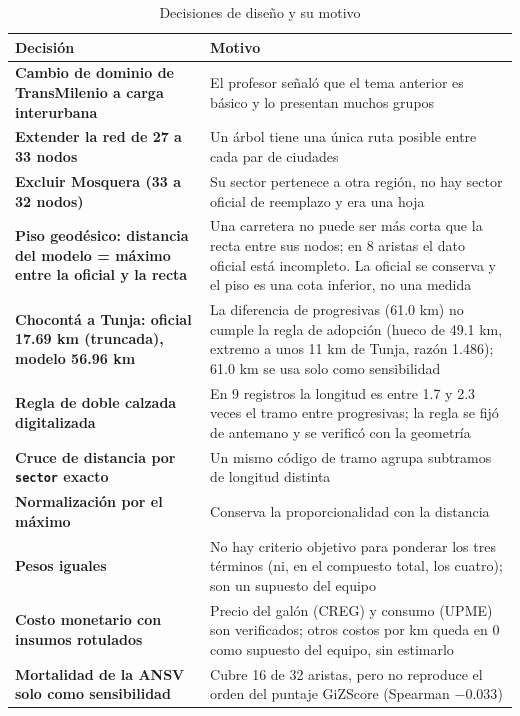 \documentclass[12pt,a4paper]{article}
\begin{document}
\begin{table}[H]
\centering
\caption{Decisiones de diseño y su motivo}
\label{tab:decisiones}
\small
\renewcommand{\arraystretch}{1.2}
\begin{tabular}{|>{\raggedright\arraybackslash}p{4.4cm}|>{\raggedright\arraybackslash}p{9cm}|}
\hline
\rowcolor{gray!20} \textbf{Decisión} & \textbf{Motivo} \\
\hline
\textbf{Cambio de dominio de TransMilenio a carga interurbana} & El profesor señaló que el tema anterior es básico y lo presentan muchos grupos \\
\hline
\textbf{Extender la red de 27 a 33 nodos} & Un árbol tiene una única ruta posible entre cada par de ciudades \\
\hline
\textbf{Excluir Mosquera (33 a 32 nodos)} & Su sector pertenece a otra región, no hay sector oficial de reemplazo y era una hoja \\
\hline
\textbf{Piso geodésico: distancia del modelo = máximo entre la oficial y la recta} & Una carretera no puede ser más corta que la recta entre sus nodos; en 8 aristas el dato oficial está incompleto. La oficial se conserva y el piso es una cota inferior, no una medida \\
\hline
\textbf{Chocontá a Tunja: oficial 17.69 km (truncada), modelo 56.96 km} & La diferencia de progresivas (61.0 km) no cumple la regla de adopción (hueco de 49.1 km, extremo a unos 11 km de Tunja, razón 1.486); 61.0 km se usa solo como sensibilidad \\
\hline
\textbf{Regla de doble calzada digitalizada} & En 9 registros la longitud es entre 1.7 y 2.3 veces el tramo entre progresivas; la regla se fijó de antemano y se verificó con la geometría \\
\hline
\textbf{Cruce de distancia por \texttt{sector} exacto} & Un mismo código de tramo agrupa subtramos de longitud distinta \\
\hline
\textbf{Normalización por el máximo} & Conserva la proporcionalidad con la distancia \\
\hline
\textbf{Pesos iguales} & No hay criterio objetivo para ponderar los tres términos (ni, en el compuesto total, los cuatro); son un supuesto del equipo \\
\hline
\textbf{Costo monetario con insumos rotulados} & Precio del galón (CREG) y consumo (UPME) son verificados; otros costos por km queda en 0 como supuesto del equipo, sin estimarlo \\
\hline
\textbf{Mortalidad de la ANSV solo como sensibilidad} & Cubre 16 de 32 aristas, pero no reproduce el orden del puntaje GiZScore (Spearman $-0.033$) \\

\end{tabular}
\end{table}
\end{document}
